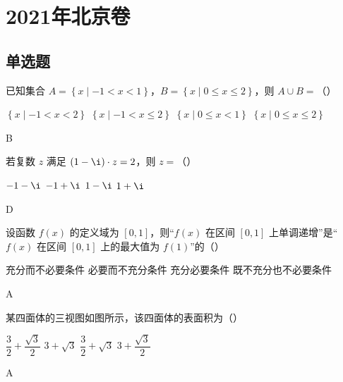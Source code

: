 \chapter{2021年北京卷}

\section{单选题}

\begin{problem}
已知集合 \(A=\left\{x\mid -1<x<1\right\}\)，\(B=\left\{x\mid 0\le x\le2\right\}\)，则 \(A\cup B=\)（\quad）

\choices
    {\(\left\{x\mid -1<x<2\right\}\)}
    {\(\left\{x\mid -1<x\le2\right\}\)}
    {\(\left\{x\mid 0\le x<1\right\}\)}
    {\(\left\{x\mid 0\le x\le2\right\}\)}
\end{problem}

\begin{answer}
B
\end{answer}

\begin{problem}
若复数 \(z\) 满足 \((1-\i)\cdot z=2\)，则 \(z=\)（\quad）

\choices
    {\(-1-\i\)}
    {\(-1+\i\)}
    {\(1-\i\)}
    {\(1+\i\)}
\end{problem}

\begin{answer}
D
\end{answer}

\begin{problem}
设函数 \(f(x)\) 的定义域为 \([0,1]\)，则“\(f(x)\) 在区间 \([0,1]\) 上单调递增”是“\(f(x)\) 在区间 \([0,1]\) 上的最大值为 \(f(1)\)”的（\quad）

\choices
    {充分而不必要条件}
    {必要而不充分条件}
    {充分必要条件}
    {既不充分也不必要条件}
\end{problem}

\begin{answer}
A
\end{answer}

\begin{problem}
某四面体的三视图如图所示，该四面体的表面积为（\quad）


\choices
    {\(\dfrac{3}{2}+\dfrac{\sqrt3}{2}\)}
    {\(3+\sqrt3\)}
    {\(\dfrac{3}{2}+\sqrt3\)}
    {\(3+\dfrac{\sqrt3}{2}\)}
\end{problem}

\begin{answer}
A
\end{answer}

